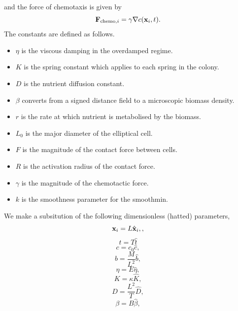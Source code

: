 and the force of chemotaxis is given by 
\begin{equation*}
    \vb{F}_{\textrm{chemo},i} = \gamma \nabla c (\vb{x}_i, t).
\end{equation*}
The constants are defined as follows. 
\begin{itemize}
    \item $\eta$ is the viscous damping in the overdamped regime.
    \item $K$ is the spring constant which applies to each spring in the colony.
    \item $D$ is the nutrient diffusion constant.
    \item $\beta$ converts from a signed distance field to a microscopic biomass density.
    \item $r$ is the rate at which nutrient is metabolised by the biomass.
    \item $L_0$ is the major diameter of the elliptical cell.
    \item $F$ is the magnitude of the contact force between cells.
    \item $R$ is the activation radius of the contact force.
    \item $\gamma$ is the magnitude of the chemotactic force.
    \item $k$ is the smoothness parameter for the smoothmin.
\end{itemize}
We make a subsitution of the following dimensionless (hatted) parameters,
\begin{equation*}
    \vb{x}_i = L\hat{\vb{x}}_i,,
\end{equation*}
\begin{equation*}
    t = T\hat{t}
\end{equation*}
\begin{equation*}
    c = c_0 \hat{c},
\end{equation*}
\begin{equation*}
    b = \frac{M}{L^2}\hat{b},
\end{equation*}
\begin{equation*}
    \eta = E \hat{\eta},
\end{equation*}
\begin{equation*}
    K = \kappa \hat{K},
\end{equation*}
\begin{equation*}
    D = \frac{L^2}{T} \hat{D},
\end{equation*}
\begin{equation*}
    \beta = B \hat{\beta},
\end{equation*}
